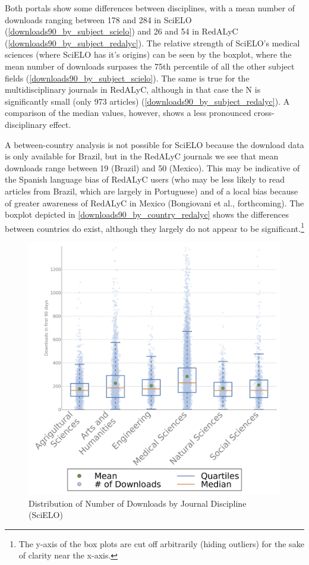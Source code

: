 Both portals show some differences between disciplines, with a mean number of downloads ranging between 178 and 284 in SciELO (\autoref{downloads90_by_subject_scielo}) and 26 and 54 in RedALyC (\autoref{downloads90_by_subject_redalyc}). The relative strength of SciELO's medical sciences (where SciELO has it's origins) can be seen by the boxplot, where the mean number of downloads surpases the 75th percentile of all the other subject fields (\autoref{downloads90_by_subject_scielo}). The same is true for the multidisciplinary journals in RedALyC, although in that case the N is significantly small (only 973 articles) (\autoref{downloads90_by_subject_redalyc}). A comparison of the median values, however, shows a less pronounced cross-disciplinary effect.

A between-country analysis is not possible for SciELO because the download data is only available for Brazil, but in the RedALyC journals we see that mean downloads range between 19 (Brazil) and 50 (Mexico). This may be indicative of the Spanish language bias of RedALyC users (who may be less likely to read articles from Brazil, which are largely in Portuguese) and of a local bias because of greater awareness of RedALyC in Mexico (Bongiovani et al., forthcoming). The boxplot depicted in \autoref{downloads90_by_country_redalyc} shows the differences between countries do exist, although they largely do not appear to be significant.\footnote{The y-axis of the box plots are cut off arbitrarily (hiding outliers) for the sake of clarity near the x-axis.}

\begin{figure}[htbp]
\centering
\includegraphics[keepaspectratio,width=\textwidth,height=0.45\textheight]{figures/downloads90_by_subject_scielo.png}
\caption{Distribution of Number of Downloads by Journal Discipline (SciELO)}
\label{downloads90_by_subject_scielo}
\end{figure}

